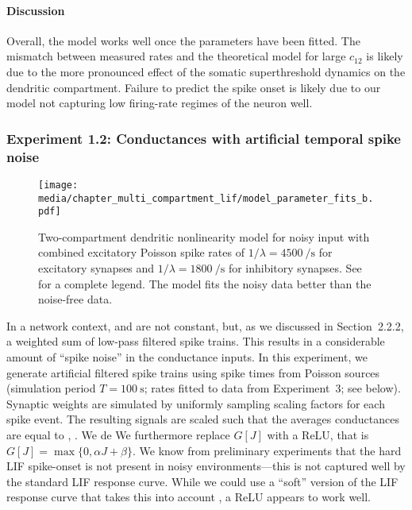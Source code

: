 \paragraph{Discussion}
Overall, the model works well once the parameters have been fitted.
The mismatch between measured rates and the theoretical model for large $c_{12}$ is likely due to the more pronounced effect of the somatic superthreshold dynamics on the dendritic compartment.
Failure to predict the spike onset is likely due to our model not capturing low firing-rate regimes of the neuron well.

\subsubsection{Experiment 1.2: Conductances with artificial temporal spike noise}

\begin{figure}[t]
	\texttt{[image: media/chapter\_multi\_compartment\_lif/model\_parameter\_fits\_b.pdf]}%
	\caption[Two-compartment dendritic nonlinearity model for noisy input]{Two-compartment dendritic nonlinearity model for noisy input with combined excitatory Poisson spike rates of $1/\lambda = \SI{4500}{\per\second}$ for excitatory synapses and $1/\lambda = \SI{1800}{\per\second}$ for inhibitory synapses.
	See  for a complete legend.
	The model fits the noisy data better than the noise-free data.
	    }
	\label{fig:synaptic_nonlinearity_fit_b}%
\end{figure}

In a network context, \gE and \gI are not constant, but, as we discussed in Section~2.2.2, a weighted sum of low-pass filtered spike trains.
This results in a considerable amount of \enquote{spike noise} in the conductance inputs.
In this experiment, we generate artificial filtered spike trains using spike times from Poisson sources (simulation period $T = \SI{100}{\second}$; rates fitted to data from Experiment~3; see below).
Synaptic weights are simulated by uniformly sampling scaling factors for each spike event.
The resulting signals are scaled such that the averages conductances are equal to \gE, \gI.
We de
We furthermore replace $G[J]$ with a ReLU, that is $G[J] = \max\{ 0, \alpha J + \beta \}$.
We know from preliminary experiments that the hard LIF spike-onset is not present in noisy environments---this is not captured well by the standard LIF response curve.
While we could use a \enquote{soft} version of the LIF response curve that takes this into account \citep[cf.][]{capocelli1971diffusion,hunsberger2014competing,kreutz2015mean}, a ReLU appears to work well.

